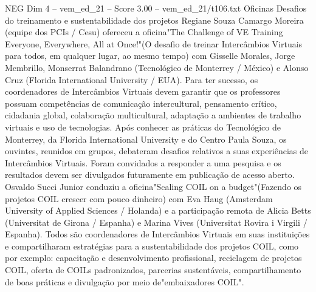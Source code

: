 \begin{textsample}{NEG Dim 4 – vem\_ed\_21 – Score 3.00 – vem\_ed\_21/t106.txt}  \label{ex:f4_neg_072}
Oficinas Desafios do treinamento e sustentabilidade dos projetos Regiane Souza Camargo Moreira (equipe dos PCIs / Cesu) ofereceu a oficina"The Challenge of VE Training Everyone, Everywhere, All at Once!"(O desafio de treinar Intercâmbios Virtuais para todos, em qualquer lugar, ao mesmo tempo) com Gisselle Morales, Jorge Membrillo, Monserrat Balandrano (Tecnológico de Monterrey / México) e Alonso Cruz (Florida International University / EUA).
Para ter sucesso, os coordenadores de Intercâmbios Virtuais devem garantir que os professores possuam competências de comunicação intercultural, pensamento crítico, cidadania global, colaboração multicultural, adaptação a ambientes de trabalho virtuais e uso de tecnologias.
Após conhecer as práticas do Tecnológico de Monterrey, da Florida International University e do Centro Paula Souza, os ouvintes, reunidos em grupos, debateram desafios relativos a suas experiências de Intercâmbios Virtuais.
Foram convidados a responder a uma pesquisa e os resultados devem ser divulgados futuramente em publicação de acesso aberto.
Osvaldo Succi Junior conduziu a oficina"Scaling COIL on a budget"(Fazendo os projetos COIL crescer com pouco dinheiro) com Eva Haug (Amsterdam University of Applied Sciences / Holanda) e a participação remota de Alicia Betts (Universitat de Girona / Espanha) e Marina Vives (Universitat Rovira i Virgili / Espanha).
Todos são coordenadores de Intercâmbios Virtuais em suas instituições e compartilharam estratégias para a sustentabilidade dos projetos COIL, como por exemplo: capacitação e desenvolvimento profissional, reciclagem de projetos COIL, oferta de COILs padronizados, parcerias sustentáveis, compartilhamento de boas práticas e divulgação por meio de"embaixadores COIL".

\end{textsample}
